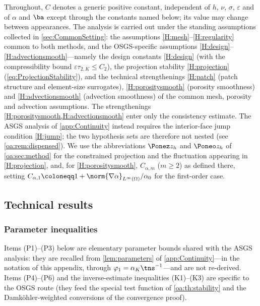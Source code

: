 Throughout, $C$ denotes a generic positive constant, independent of $h$, $\nu$,
$\sigma$, $\varepsilon$ and of $\alpha$ and $\ba$ except through the constants named
below; its value may change between appearances. The analysis is carried out under the
standing assumptions collected in \cref{sec:CommonSetting}: the assumptions
\cref{H:mesh}--\cref{H:regularity} common to both methods, and the OSGS{\hyp}specific
assumptions \cref{H:design}--\cref{H:advectionsmooth}---namely the design constants
\cref{H:design} (with the compressibility bound $\varepsilon\tau_{2,K}\le C_2$), the projection
stability \cref{H:projection} (\cref{eq:ProjectionStability}), and the technical strengthenings
\cref{H:patch} (patch structure and element{\hyp}size surrogates), \cref{H:porositysmooth}
(porosity smoothness) and \cref{H:advectionsmooth} (advection smoothness) of the common mesh,
porosity and advection assumptions. The strengthenings \cref{H:porositysmooth,H:advectionsmooth}
enter only the consistency estimate. The ASGS analysis of \cref{app:Continuity} instead requires
the interior{\hyp}face jump condition \cref{H:jump}; the two hypothesis sets are therefore not
nested (see \cref{oa:rem:dispensed}). We use the abbreviations $\Ponez z_h$ and $\Poneo z_h$ of
\cref{oa:sec:method} for the constrained projection and the fluctuation appearing in
\cref{H:projection}, and, for \cref{H:porositysmooth}, $C_{\alpha,m}$ ($m\ge2$) as defined there,
setting $C_{\alpha,1}\coloneqq 1+\norm{\nabla\alpha}_{L^\infty(\Omega)}/\alpha_0$ for the
first{\hyp}order case.

\subsection{Technical results}
\label{oa:sec:technical}

\subsubsection{Parameter inequalities}

Items (P1)--(P3) below are elementary parameter bounds shared with the ASGS analysis: they are
recalled from \cref{lem:parameters} of \cref{app:Continuity}---in the notation of this appendix,
through $\varphi_1=\alpha_K\tns^{-1}$---and are not re-derived. Items (P4)--(P6) and the
inverse{\hyp}estimate inequalities (K1)--(K3) are specific to the OSGS route (they feed the
special test function of \cref{oa:th:stability} and the Damk\"ohler-weighted conversions of the
convergence proof).


